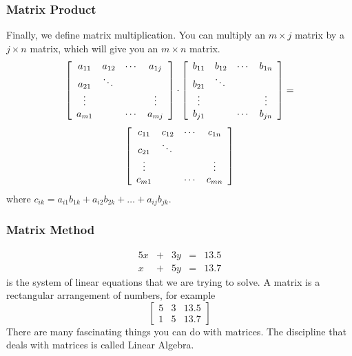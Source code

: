 \documentclass[xcolor=dvipsnames]{beamer}
\begin{document}
\begin{frame}
  \frametitle{Matrix Product}
Finally, we define matrix multiplication. You can multiply an
$m\times{}j$ matrix by a $j\times{}n$ matrix, which will give you an
$m\times{}n$ matrix.
\begin{equation}
  \label{eq:orahpahn}
  \left[\begin{array}{cccc}
    a_{11}&a_{12}&\cdots{}&a_{1j} \\
          a_{21}&\ddots{}&& \\
          \vdots{}&&&\vdots \\
          a_{m1}&&\cdots{}&a_{mj}
  \end{array}\right]\cdot
\left[\begin{array}{cccc}
    b_{11}&b_{12}&\cdots{}&b_{1n} \\
          b_{21}&\ddots{}&& \\
          \vdots{}&&&\vdots \\
          b_{j1}&&\cdots{}&b_{jn}
  \end{array}\right]=\notag
\end{equation}
\begin{equation}
  \label{eq:raipuboi}
  \left[\begin{array}{cccc}
    c_{11}&c_{12}&\cdots{}&c_{1n} \\
          c_{21}&\ddots{}&& \\
          \vdots{}&&&\vdots \\
          c_{m1}&&\cdots{}&c_{mn}
  \end{array}\right]\notag
\end{equation}
where $c_{ik}=a_{i1}b_{1k}+a_{i2}b_{2k}+\ldots+a_{ij}b_{jk}$.
\end{frame}

\begin{frame}
  \frametitle{Matrix Method}
  \begin{equation}
    \label{eq:ohghohfi}
    \begin{array}{rcrcl}
      5x&+&3y&=&13.5 \\
      x&+&5y&=&13.7
    \end{array}
  \end{equation}
is the system of linear equations that we are trying to solve. A
matrix is a rectangular arrangement of numbers, for example
\begin{equation}
  \label{eq:cegeemoi}
  \left[\begin{array}{ccc}
    5&3&13.5 \\
    1&5&13.7
  \end{array}\right]
\end{equation}
There are many fascinating things you can do with matrices. The
discipline that deals with matrices is called Linear Algebra. 
\end{frame}
\end{document}
